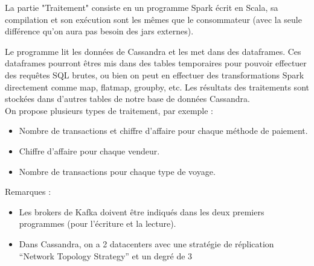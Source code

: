 \documentclass[a4paper, 11pt, titlepage]{article}
\begin{document}
La partie "Traitement" consiste en un programme Spark écrit en Scala, sa compilation et son exécution sont les mêmes que le consommateur (avec la seule différence qu'on aura pas besoin des jars externes).

Le programme lit les données de Cassandra et les met dans des dataframes. Ces dataframes pourront êtres mis dans des tables temporaires pour pouvoir effectuer des requêtes SQL brutes, ou bien on peut en effectuer des transformations Spark directement comme map, flatmap, groupby, etc.
Les résultats des traitements sont stockées dans d'autres tables de notre base de données Cassandra.\\


On propose plusieurs types de traitement, par exemple :

\begin{itemize}
\item
Nombre de transactions et chiffre d'affaire pour chaque méthode de paiement.
\item
Chiffre d'affaire pour chaque vendeur.
\item
Nombre de transactions pour chaque type de voyage.\\
\end{itemize}


Remarques :

\begin{itemize}

\item
Les brokers de Kafka doivent être indiqués dans les deux premiers programmes (pour l'écriture et la lecture).

\item
Dans Cassandra, on a 2 datacenters avec une stratégie de réplication “Network Topology Strategy” et  un degré de 3
 
\end{itemize}
\end{document}
